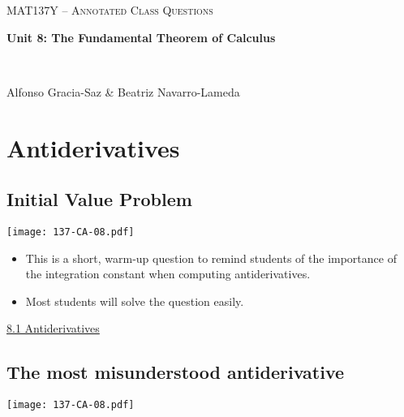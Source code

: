\documentclass[11pt]{article}
\newcommand{\nl}{\hfill \vspace{-1.1\baselineskip}} %
\newcommand{\vi}{\hspace{8mm} \href{https://www.youtube.com/watch?v=xcyL3sEL2mM&list=PLlwePzQY_wW_8-sITAbG_GU2JgiuwXkDN&index=1}{8.1 Antiderivatives}}
\begin{document}
\thispagestyle{empty}
	\begin{center}
		{ {\LARGE  \scshape
		\textcolor{137cp3}{MAT137Y --   Annotated Class Questions}
		}
		
		\medskip
		{\bf \Large \textcolor{137cp1}{Unit 8: The Fundamental Theorem of Calculus
		}}
		
		\
		
		\medskip
		{\large
		\textcolor{137cp1}{Alfonso Gracia-Saz \& Beatriz Navarro-Lameda}
		}}
	\end{center}

\vspace{5mm}

\tableofcontents

\newpage

\section{Antiderivatives}
\subsection{Initial Value Problem}

\begin{center}
{ \texttt{[image: 137-CA-08.pdf]}} 
\end{center}

\begin{comments}
\nl
	\begin{itemize}
		\item This is a short, warm-up question to remind students of the importance of the integration constant when computing antiderivatives.  
		\item Most students will solve the question easily.
	\end{itemize}
\end{comments}

\begin{videos}
\vi
\end{videos}

\newpage
\subsection{The most misunderstood antiderivative}

\begin{center}
{ \texttt{[image: 137-CA-08.pdf]}} 
\end{center}
\end{document}

